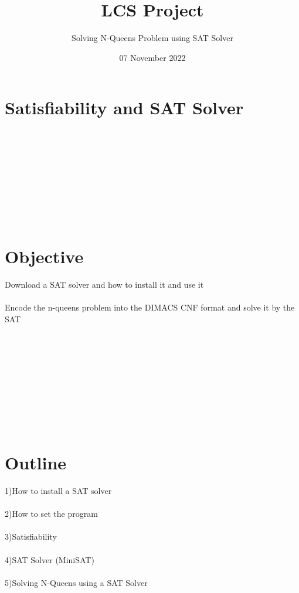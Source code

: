 \documentclass{article}
\title{LCS Project}
\author{Solving N-Queens Problem using SAT Solver
}
\date{07 November 2022}
\begin{document}
\maketitle

\section{ Satisfiability and SAT Solver}
\\
 \\
\\
\\
\\ \\ 
\\ \\
\section{ Objective}
Download a SAT solver and how to install it and use it
\\ \\
Encode the n-queens problem into the DIMACS CNF format
      and solve it by the SAT
\\ \\
\\ \\ \\ \\ 
\\ \\ \\ \\
\section{Outline} 


1)How to install a SAT solver
\\ \\
2)How to set the program
\\ \\
3)Satisfiability
\\ \\
4)SAT Solver (MiniSAT)
\\ \\
5)Solving N-Queens using a SAT Solver
\\ \\
\end{document}
